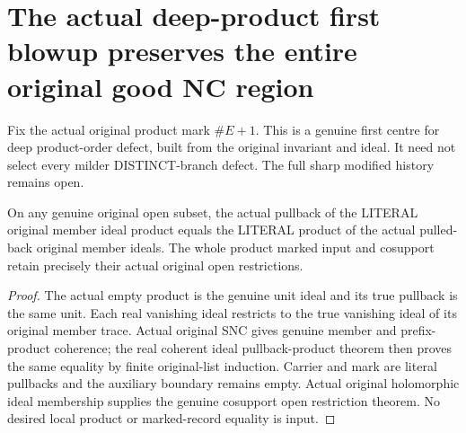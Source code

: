 \section{The actual deep-product first blowup preserves the entire original good NC region}

Fix the actual original product mark $\#E+1$. This is a genuine first centre for deep product-order defect, built from the original invariant and ideal. It need not select every milder DISTINCT-branch defect. The full sharp modified history remains open.

\begin{lemma}
\label{hir:sharp-original-member-product-actual-open-pullback}
\leanok
On any genuine original open subset, the actual pullback of the LITERAL original member ideal product equals the LITERAL product of the actual pulled-back original member ideals. The whole product marked input and cosupport retain precisely their actual original open restrictions.
\end{lemma}
\begin{proof}
The actual empty product is the genuine unit ideal and its true pullback is the same unit. Each real vanishing ideal restricts to the true vanishing ideal of its original member trace. Actual original SNC gives genuine member and prefix-product coherence; the real coherent ideal pullback-product theorem then proves the same equality by finite original-list induction. Carrier and mark are literal pullbacks and the auxiliary boundary remains empty. Actual original holomorphic ideal membership supplies the genuine cosupport open restriction theorem. No desired local product or marked-record equality is input.
\end{proof}


